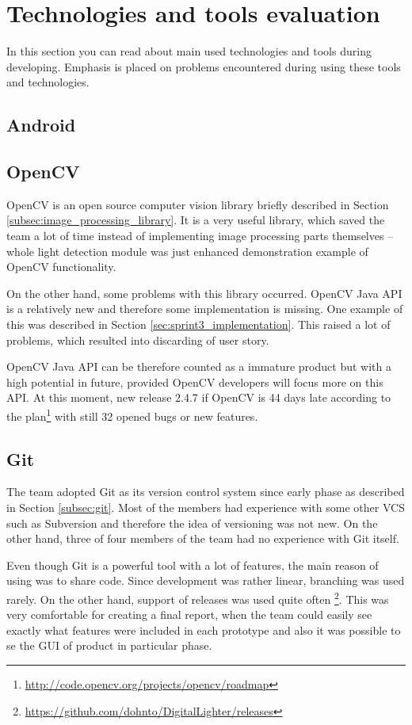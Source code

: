 \section{Technologies and tools evaluation}
In this section you can read about main used technologies and tools during developing.
Emphasis is placed on problems encountered during using these tools and technologies.

\subsection{Android}

\subsection{OpenCV}
OpenCV is an open source computer vision library briefly described in Section \ref{subsec:image_processing_library}.
It is a very useful library, which saved the team a lot of time instead of implementing image processing parts themselves
 -- whole light detection module was just enhanced demonstration example of OpenCV functionality.

On the other hand, some problems with this library occurred.
OpenCV Java API is a relatively new and therefore some implementation is missing.
One example of this was described in Section \ref{sec:sprint3_implementation}.
This raised a lot of problems, which resulted into discarding of user story.

OpenCV Java API can be therefore counted as a immature product but with a high potential in future, provided OpenCV developers will focus more on this API.
At this moment, new release 2.4.7 if OpenCV is 44 days late according to the plan\footnote{\url{http://code.opencv.org/projects/opencv/roadmap}} with still 32 opened bugs or new features.

\subsection{Git}
The team adopted Git as its version control system since early phase as described in Section \ref{subsec:git}.
Most of the members had experience with some other VCS such as Subversion and therefore the idea of versioning was not new.
On the other hand, three of four members of the team had no experience with Git itself.

Even though Git is a powerful tool with a lot of features, the main reason of using was to share code.
Since development was rather linear, branching was used rarely.
On the other hand, support of releases was used quite often \footnote{\url{https://github.com/dohnto/DigitalLighter/releases}}.
This was very comfortable for creating a final report, when the team could easily see exactly what features were included in each prototype and also it was possible to se the GUI of product in particular phase.

